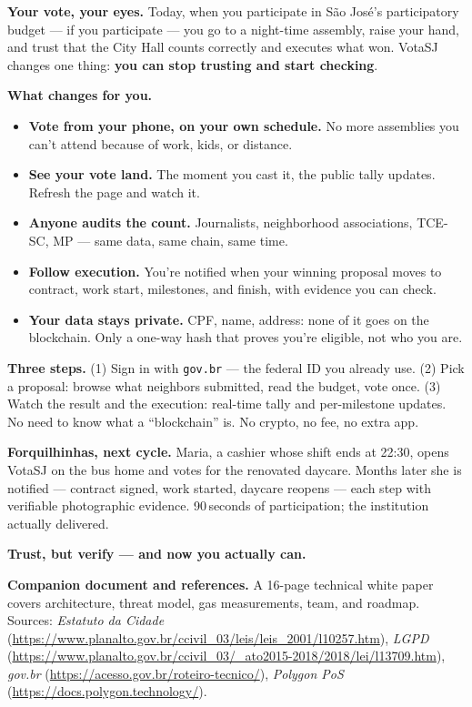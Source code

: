 \documentclass[12pt]{article}
\begin{document}
\noindent\textbf{Your vote, your eyes.} Today, when you participate in S\~ao
Jos\'e's participatory budget --- if you participate --- you go to a
night-time assembly, raise your hand, and trust that the City Hall counts
correctly and executes what won. VotaSJ changes one thing: \textbf{you can
stop trusting and start checking}.

\noindent\textbf{What changes for you.}
\begin{itemize}
  \item \textbf{Vote from your phone, on your own schedule.} No more
        assemblies you can't attend because of work, kids, or distance.
  \item \textbf{See your vote land.} The moment you cast it, the public
        tally updates. Refresh the page and watch it.
  \item \textbf{Anyone audits the count.} Journalists, neighborhood
        associations, TCE-SC, MP --- same data, same chain, same time.
  \item \textbf{Follow execution.} You're notified when your winning
        proposal moves to contract, work start, milestones, and finish,
        with evidence you can check.
  \item \textbf{Your data stays private.} CPF, name, address: none of it
        goes on the blockchain. Only a one-way hash that proves
        you're eligible, not who you are.
\end{itemize}

\noindent\textbf{Three steps.} (1) Sign in with \texttt{gov.br}
--- the federal ID you already use. (2) Pick a proposal: browse what
neighbors submitted, read the budget, vote once. (3) Watch the result and
the execution: real-time tally and per-milestone updates. No need to know
what a ``blockchain'' is. No crypto, no fee, no extra app.

\noindent\textbf{Forquilhinhas, next cycle.} Maria, a cashier whose shift
ends at 22:30, opens VotaSJ on the bus home and votes for the renovated
daycare. Months later she is notified --- contract signed, work started,
daycare reopens --- each step with verifiable photographic evidence.
90\,seconds of participation; the institution actually delivered.

\medskip
\noindent\textbf{Trust, but verify --- and now you actually can.}

\medskip
{\footnotesize\noindent\textbf{Companion document and references.} A
16-page technical white paper covers architecture, threat model, gas
measurements, team, and roadmap. Sources: \emph{Estatuto da Cidade}
(\url{https://www.planalto.gov.br/ccivil_03/leis/leis_2001/l10257.htm}),
\emph{LGPD}
(\url{https://www.planalto.gov.br/ccivil_03/_ato2015-2018/2018/lei/l13709.htm}),
\emph{gov.br} (\url{https://acesso.gov.br/roteiro-tecnico/}),
\emph{Polygon PoS} (\url{https://docs.polygon.technology/}).}
\end{document}
